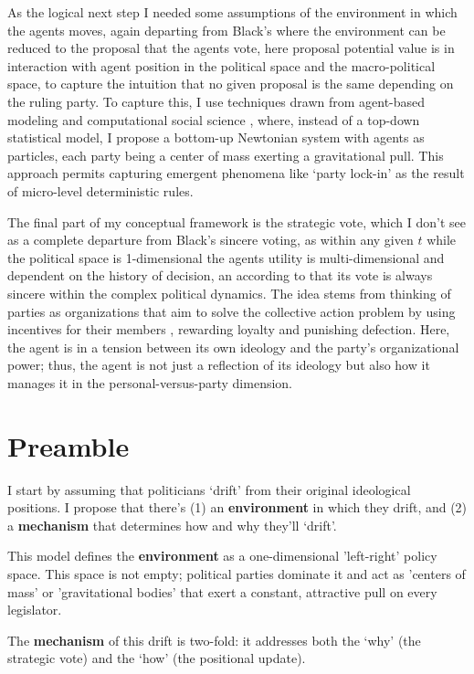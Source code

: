 \documentclass{article}
\begin{document}
	As the logical next step I needed some assumptions of the environment in which the agents moves, again departing from Black's where the environment can be reduced to the proposal that the agents vote, here proposal potential value is in interaction with agent position in the political space and the macro-political space, to capture the intuition that no given proposal is the same depending on the ruling party. To capture this, I use techniques drawn from agent-based modeling and computational social science \cite{conte_agent-based_2014}, where, instead of a top-down statistical model, I propose a bottom-up Newtonian system with agents as particles, each party being a center of mass exerting a gravitational pull. This approach permits capturing emergent phenomena like `party lock-in' as the result of micro-level deterministic rules.
	
	The final part of my conceptual framework is the strategic vote, which I don't see as a complete departure from Black's sincere voting, as within any given $t$ while the political space is 1-dimensional the agents utility is multi-dimensional and dependent on the history of decision, an according to that its vote is always sincere within the complex political dynamics. The idea stems from thinking of parties as organizations that aim to solve the collective action problem by using incentives for their members \cite{cox_setting_2005}, rewarding loyalty and punishing defection. Here, the agent is in a tension between its own ideology and the party's organizational power; thus, the agent is not just a reflection of its ideology but also how it manages it in the personal-versus-party dimension.
	
	\section{Preamble}
	
	I start by assuming that politicians `drift' from their original ideological positions. I propose that there's (1) an \textbf{environment} in which they drift, and (2) a \textbf{mechanism} that determines how and why they'll `drift'.
	
	This model defines the \textbf{environment} as a one-dimensional 'left-right' policy space. This space is not empty; political parties dominate it and act as 'centers of mass' or 'gravitational bodies' that exert a constant, attractive pull on every legislator.
	
	The \textbf{mechanism} of this drift is two-fold: it addresses both the `why' (the strategic vote) and the `how' (the positional update).
	
\end{document}
